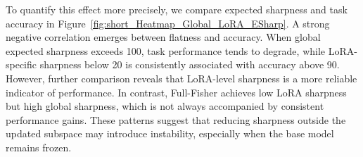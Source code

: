 \documentclass[letterpaper]{article} %
\begin{document}


To quantify this effect more precisely, we compare expected sharpness and task accuracy in Figure~\ref{fig:short_Heatmap_Global_LoRA_ESharp}. A strong negative correlation emerges between flatness and accuracy. When global expected sharpness exceeds 100, task performance tends to degrade, while LoRA-specific sharpness below 20 is consistently associated with accuracy above 90. However, further comparison reveals that LoRA-level sharpness is a more reliable indicator of performance. In contrast, Full-Fisher achieves low LoRA sharpness but high global sharpness, which is not always accompanied by consistent performance gains. These patterns suggest that reducing sharpness outside the updated subspace may introduce instability, especially when the base model remains frozen.
\end{document}
